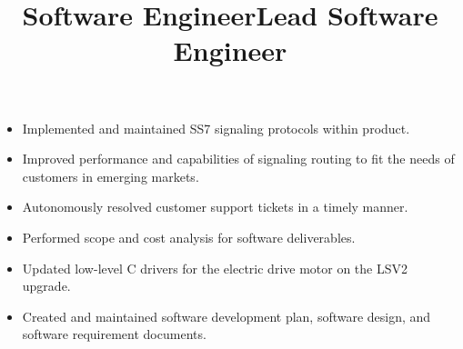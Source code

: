 \documentclass[margin]{res}
\begin{document}
\begin{resume}
\title{\textbf{Software Engineer}}
\begin{position}\phantom{spacing}
\begin{itemize}[noitemsep, topsep=0pt]
\item Implemented and maintained SS7 signaling protocols within product. 
\item Improved performance and capabilities of signaling routing to fit the needs of customers in emerging markets. 
\item Autonomously resolved customer support tickets in a timely manner. 
\end{itemize}
\end{position}

\title{\textbf{Lead Software Engineer}}
\begin{position}\phantom{spacing}
\begin{itemize}[noitemsep, topsep=0pt]
\item Performed scope and cost analysis for software deliverables. 
\item Updated low-level C drivers for the electric drive motor on the LSV2 upgrade.  
\item Created and maintained software development plan, software design, and software requirement documents. 
\end{itemize}
\end{position}

%


\end{resume}
\end{document}
